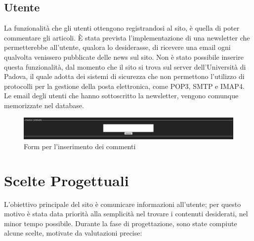 \documentclass[10pt, a4paper]{article}
\begin{document}
\subsection{Utente}
La funzionalità che gli utenti ottengono registrandosi al sito, è quella di poter commentare gli articoli. È stata prevista l’implementazione di una newsletter che permetterebbe all’utente, qualora lo desiderasse, di ricevere una email ogni qualvolta venissero pubblicate delle news sul sito. Non è stato possibile inserire questa funzionalità, dal momento che il sito si trova sul server dell’Università di Padova, il quale adotta dei sistemi di sicurezza che non permettono l’utilizzo di protocolli per la gestione della posta elettronica, come POP3, SMTP e IMAP4. Le email degli utenti che hanno sottoscritto la newsletter, vengono comunque memorizzate nel database.
\begin{figure}[h!]
 \centering
  \includegraphics[width=1\textwidth]{Images/commento.png}
  \caption{Form per l'inserimento dei commenti}
  \label{fig:commento}
\end{figure}

\section{Scelte Progettuali}
L’obiettivo principale del sito è comunicare informazioni all’utente; per questo motivo è stata data priorità alla semplicità nel trovare i contenuti desiderati, nel minor tempo possibile.
Durante la fase di progettazione, sono state compiute alcune scelte, motivate da valutazioni precise:
\end{document}
